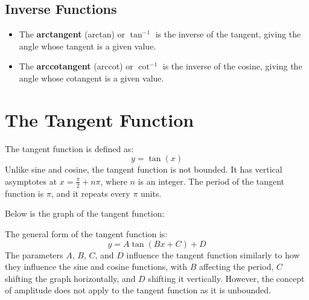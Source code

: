 \documentclass[12pt]{article}
\begin{document}
\newpage

\subsection*{Inverse Functions}
\begin{itemize}
    \item The \textbf{arctangent} (arctan) or \textbf{$\tan^{-1}$} is the inverse of the tangent, giving the angle whose tangent is a given value.
    \item The \textbf{arccotangent} (arccot) or \textbf{$\cot^{-1}$} is the inverse of the cosine, giving the angle whose cotangent is a given value.
\end{itemize}

\section*{The Tangent Function}
The tangent function is defined as:
\[
y = \tan(x)
\]
Unlike sine and cosine, the tangent function is not bounded. It has vertical asymptotes at $x = \frac{\pi}{2} + n\pi$, where $n$ is an integer. The period of the tangent function is $\pi$, and it repeats every $\pi$ units.

Below is the graph of the tangent function:

\begin{center}
\end{center}

The general form of the tangent function is:
\[
y = A \tan(Bx + C) + D
\]
The parameters $A$, $B$, $C$, and $D$ influence the tangent function similarly to how they influence the sine and cosine functions, with $B$ affecting the period, $C$ shifting the graph horizontally, and $D$ shifting it vertically. However, the concept of amplitude does not apply to the tangent function as it is unbounded.
\end{document}
